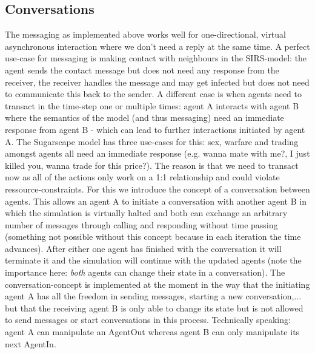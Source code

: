 

\subsection{Conversations}
The messaging as implemented above works well for one-directional, virtual asynchronous interaction where we don't need a reply at the same time. A perfect use-case for messaging is making contact with neighbours in the SIRS-model: the agent sends the contact message but does not need any response from the receiver, the receiver handles the message and may get infected but does not need to communicate this back to the sender. 
A different case is when agents need to transact in the time-step one or multiple times: agent A interacts with agent B where the semantics of the model (and thus messaging) need an immediate response from agent B - which can lead to further interactions initiated by agent A. The Sugarscape model has three use-cases for this: sex, warfare and trading amongst agents all need an immediate response (e.g. wanna mate with me?, I just killed you, wanna trade for this price?). The reason is that we need to transact now as all of the actions only work on a 1:1 relationship and could violate ressource-constraints.
For this we introduce the concept of a conversation between agents. This allows an agent A to initiate a conversation with another agent B in which the simulation is virtually halted and both can exchange an arbitrary number of messages through calling and responding without time passing (something not possible without this concept because in each iteration the time advances). After either one agent has finished with the conversation it will terminate it and the simulation will continue with the updated agents (note the importance here: \textit{both} agents can change their state in a conversation). The conversation-concept is implemented at the moment in the way that the initiating agent A has all the freedom in sending messages, starting a new conversation,... but that the receiving agent B is only able to change its state but is not allowed to send messages or start conversations in this process. Technically speaking: agent A can manipulate an AgentOut whereas agent B can only manipulate its next AgentIn.
